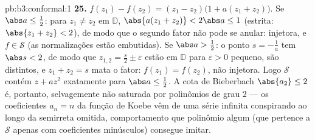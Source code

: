 \begin{solution}{pb:b3:conformal:1}
\textbf{25.} $f(z_1) - f(z_2) = (z_1 - z_2)\bigl(1 + a(z_1 +
z_2)\bigr)$. Se $\abs a \leq \frac12$: para $z_1 \neq z_2$ em
$\mathbb D$, $\abs{a(z_1 + z_2)} < 2\abs a \leq 1$ (estrita:
$\abs{z_1 + z_2} < 2$), de modo que o segundo fator não pode se anular:
injetora, e $f \in \mathcal S$ (as normalizações estão
embutidas). Se $\abs a > \frac12$: o ponto $s =
-\frac1a$ tem $\abs s < 2$, de modo que $z_{1,2} = \frac s2 \pm
\varepsilon$ estão em $\mathbb D$ para $\varepsilon > 0$ pequeno,
são distintos, e $z_1 + z_2 = s$ mata o fator: $f(z_1)
= f(z_2)$, não injetora. Logo $\mathcal S$ contém $z +
az^2$ exatamente para $\abs a \leq \frac12$. A cota de Bieberbach
$\abs{a_2} \leq 2$ é, portanto, selvagemente não saturada por
polinômios de grau $2$ --- os coeficientes
$a_n = n$ da função de Koebe vêm de uma série infinita
conspirando ao longo da semirreta omitida, comportamento que polinômio algum
(que pertence a $\mathcal S$ apenas com coeficientes minúsculos)
consegue imitar.
\end{solution}
